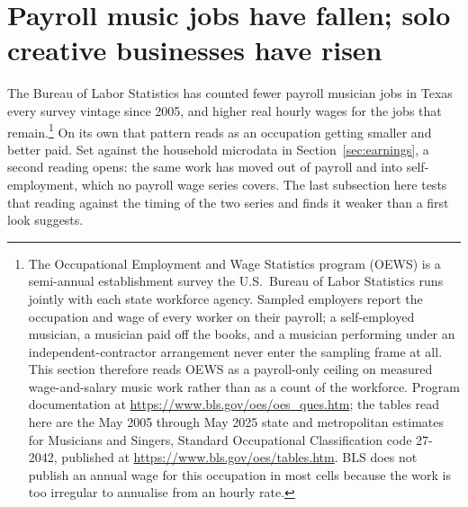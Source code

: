 \section{Payroll music jobs have fallen; solo creative businesses have risen}
\label{sec:payroll}

The Bureau of Labor Statistics has counted fewer payroll musician jobs in Texas
every survey vintage since 2005, and higher real hourly wages for the jobs that
remain.\footnote{The Occupational Employment and Wage Statistics program
(OEWS) is a semi-annual establishment survey the U.S.\ Bureau of Labor
Statistics runs jointly with each state workforce agency. Sampled employers
report the occupation and wage of every worker on their payroll; a
self-employed musician, a musician paid off the books, and a musician
performing under an independent-contractor arrangement never enter the
sampling frame at all. This section therefore reads OEWS as a payroll-only
ceiling on measured wage-and-salary music work rather than as a count of the
workforce. Program documentation at \url{https://www.bls.gov/oes/oes_ques.htm};
the tables read here are the May 2005 through May 2025 state and metropolitan
estimates for Musicians and Singers, Standard Occupational Classification code
27-2042, published at \url{https://www.bls.gov/oes/tables.htm}. BLS does not
publish an annual wage for this occupation in most cells because the work is
too irregular to annualise from an hourly rate.} On its own that pattern reads
as an occupation getting smaller and better paid. Set against the household
microdata in Section~\ref{sec:earnings}, a second reading opens: the same
work has moved out of payroll and into self-employment, which no payroll
wage series covers. The last subsection here tests that reading against the
timing of the two series and finds it weaker than a first look suggests.


